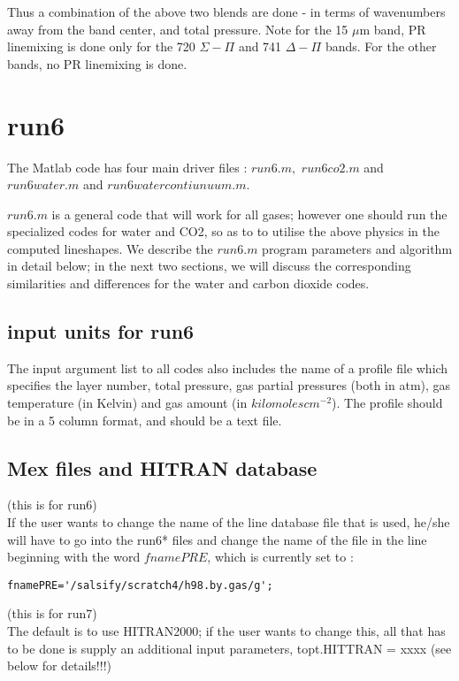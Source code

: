 \documentclass[11pt]{article}
\begin{document}
Thus a combination of the above two blends are done - in terms of 
wavenumbers away from the band center, and total pressure. 
Note for the 15 $\mu$m band, PR linemixing is done only for the 720 
$\Sigma-\Pi$ and 741 $\Delta-\Pi$ bands. For the other bands, no PR linemixing
is done.

\newpage
\section{run6}

The Matlab code has four main driver files : $run6.m,$ $run6co2.m$ and
$run6water.m$ and $run6watercontiunuum.m.$ 

$run6.m$ is a general code that will work for all gases; however 
one should run the specialized codes for water and CO2, so as to to utilise 
the above physics in the computed lineshapes. We describe the $run6.m$ 
program parameters and algorithm in detail below; in the next two sections, 
we will discuss the corresponding similarities and differences for the 
water and carbon dioxide codes.

\subsection{input units for run6}
The input argument list to all codes also includes the name of a profile file 
which specifies the layer number, total pressure, gas partial 
pressures (both in atm), gas temperature (in Kelvin) and gas amount 
(in $kilomoles cm^{-2}$). The profile should be in a 5 column format, 
and should be a text file.

\subsection{Mex files and HITRAN database}
(this is for run6) \\
If the user wants to change the name of the line database file that is used,
he/she will have to go into the run6* files and change the name of the 
file in the line beginning with the word $fnamePRE$, which is currently 
set to :
\begin{verbatim}
fnamePRE='/salsify/scratch4/h98.by.gas/g';
\end{verbatim}

(this is for run7) \\
The default is to use HITRAN2000; if the user wants to change this, all that
has to be done is supply an additional input parameters, topt.HITTRAN = xxxx
(see below for details!!!)
\end{document}
